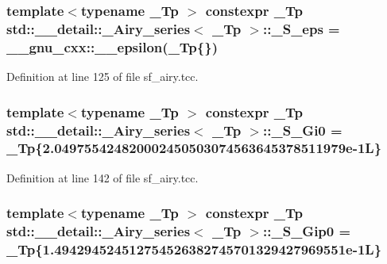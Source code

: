 \subsubsection[{\texorpdfstring{\+\_\+\+S\+\_\+eps}{_S_eps}}]{\setlength{\rightskip}{0pt plus 5cm}template$<$typename \+\_\+\+Tp $>$ constexpr \+\_\+\+Tp {\bf std\+::\+\_\+\+\_\+detail\+::\+\_\+\+Airy\+\_\+series}$<$ \+\_\+\+Tp $>$\+::\+\_\+\+S\+\_\+eps = \+\_\+\+\_\+gnu\+\_\+cxx\+::\+\_\+\+\_\+epsilon(\+\_\+\+Tp\{\})\hspace{0.3cm}{\ttfamily [static]}}\hypertarget{classstd_1_1____detail_1_1__Airy__series_aeeb50187c007e2436a80dde35250cabd}{}\label{classstd_1_1____detail_1_1__Airy__series_aeeb50187c007e2436a80dde35250cabd}


Definition at line 125 of file sf\+\_\+airy.\+tcc.

\subsubsection[{\texorpdfstring{\+\_\+\+S\+\_\+\+Gi0}{_S_Gi0}}]{\setlength{\rightskip}{0pt plus 5cm}template$<$typename \+\_\+\+Tp $>$ constexpr \+\_\+\+Tp {\bf std\+::\+\_\+\+\_\+detail\+::\+\_\+\+Airy\+\_\+series}$<$ \+\_\+\+Tp $>$\+::\+\_\+\+S\+\_\+\+Gi0 = \+\_\+\+Tp\{2.\+049755424820002450503074563645378511979e-\/1\+L\}\hspace{0.3cm}{\ttfamily [static]}}\hypertarget{classstd_1_1____detail_1_1__Airy__series_a1ffe2a989d5ab598db201c77d08dc96d}{}\label{classstd_1_1____detail_1_1__Airy__series_a1ffe2a989d5ab598db201c77d08dc96d}


Definition at line 142 of file sf\+\_\+airy.\+tcc.

\subsubsection[{\texorpdfstring{\+\_\+\+S\+\_\+\+Gip0}{_S_Gip0}}]{\setlength{\rightskip}{0pt plus 5cm}template$<$typename \+\_\+\+Tp $>$ constexpr \+\_\+\+Tp {\bf std\+::\+\_\+\+\_\+detail\+::\+\_\+\+Airy\+\_\+series}$<$ \+\_\+\+Tp $>$\+::\+\_\+\+S\+\_\+\+Gip0 = \+\_\+\+Tp\{1.\+494294524512754526382745701329427969551e-\/1\+L\}\hspace{0.3cm}{\ttfamily [static]}}\hypertarget{classstd_1_1____detail_1_1__Airy__series_aa2269595bf85d349e9e5a1e6e4abb1a4}{}\label{classstd_1_1____detail_1_1__Airy__series_aa2269595bf85d349e9e5a1e6e4abb1a4}


